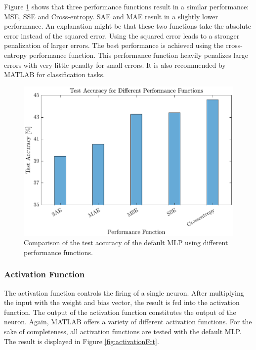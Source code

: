  Figure \ref{fig:performFct} shows that three performance functions result in a similar performance: MSE, SSE and Cross-entropy. SAE and MAE result in a slightly lower performance. An explanation might be that these two functions take the absolute error instead of the squared error. Using the squared error leads to a stronger penalization of larger errors. The best performance is achieved using the cross-entropy performance function. This performance function heavily penalizes large errors with very little penalty for small errors. It is also recommended by MATLAB for classification tasks.

 \begin{figure}[h!]
 	\centering
 	\includegraphics{images/performFct}
 	\caption{Comparison of the test accuracy of the default MLP using different performance functions.}
 	\label{fig:performFct}
 \end{figure}

 \subsubsection{Activation Function}

 The activation function controls the firing of a single neuron. After multiplying the input with the weight and bias vector, the result is fed into the activation function. The output of the activation function constitutes the output of the neuron. Again, MATLAB offers a variety of different activation functions. For the sake of completeness, all activation functions are tested with the default MLP. The result is displayed in Figure \ref{fig:activationFct}.

